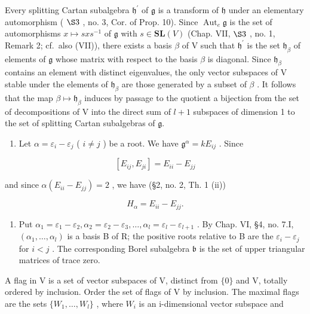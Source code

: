 Every splitting Cartan subalgebra \(\mathfrak{h}^{\prime}\) of \(\mathfrak{g}\) is a transform of \(\mathfrak{h}\) under an elementary automorphism ( \(\S3\) , no. 3, Cor. of Prop. 10). Since \(\operatorname{Aut}_{e}\mathfrak{g}\) is the set of automorphisms \(x \mapsto sxs^{-1}\) of \(\mathfrak{g}\) with \(s \in \mathbf{SL}(V)\) (Chap. VII, \(\S3\) , no. 1, Remark 2; cf.~also (VII)), there exists a basis \(\beta\) of V such that \(\mathfrak{h}^{\prime}\) is the set \(\mathfrak{h}_{\beta}\) of elements of \(\mathfrak{g}\) whose matrix with respect to the basis \(\beta\) is diagonal. Since \(\mathfrak{h}_{\beta}\) contains an element with distinct eigenvalues, the only vector subspaces of V stable under the elements of \(\mathfrak{h}_{\beta}\) are those generated by a subset of \(\beta\) . It follows that the map \(\beta \mapsto \mathfrak{h}_{\beta}\) induces by passage to the quotient a bijection from the set of decompositions of V into the direct sum of \(l + 1\) subspaces of dimension 1 to the set of splitting Cartan subalgebras of \(\mathfrak{g}\).

\begin{enumerate}
\def\labelenumi{(\Roman{enumi})}
\setcounter{enumi}{1}
\tightlist
\item
  Let \(\alpha = \varepsilon_{i} - \varepsilon_{j}\) ( \(i \neq j\) ) be a root. We have \(\mathfrak{g}^{\alpha} = kE_{ij}\) . Since
\end{enumerate}

\[
[ E _ {i j}, E _ {j i} ] = E _ {i i} - E _ {j j}
\]

and since \(\alpha(E_{ii} - E_{jj}) = 2\) , we have (§2, no. 2, Th. 1 (ii))

\[
H _ {\alpha} = E _ {i i} - E _ {j j}.
\]

\begin{enumerate}
\def\labelenumi{(\Roman{enumi})}
\setcounter{enumi}{2}
\tightlist
\item
  Put \(\alpha_{1} = \varepsilon_{1} - \varepsilon_{2},\alpha_{2} = \varepsilon_{2} - \varepsilon_{3},\ldots ,\alpha_{l} = \varepsilon_{l} - \varepsilon_{l + 1}\) . By Chap. VI, §4, no. 7.I, \((\alpha_{1},\dots,\alpha_{l})\) is a basis B of R; the positive roots relative to B are the \(\varepsilon_i - \varepsilon_j\) for \(i < j\) . The corresponding Borel subalgebra \(\mathfrak{b}\) is the set of upper triangular matrices of trace zero.
\end{enumerate}

A flag in V is a set of vector subspaces of V, distinct from \(\{0\}\) and V, totally ordered by inclusion. Order the set of flags of V by inclusion. The maximal flags are the sets \(\{W_{1},\ldots,W_{l}\}\) , where \(W_{i}\) is an i-dimensional vector subspace and

